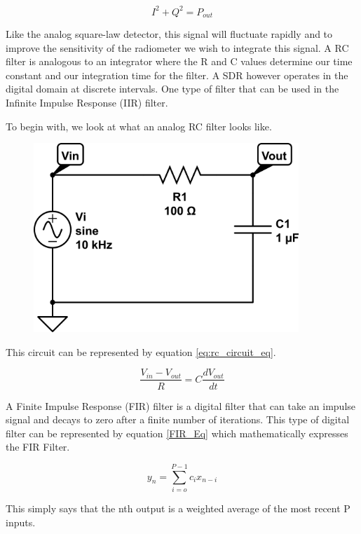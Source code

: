 \begin{equation}\label{sdr_x2}
I^2+Q^2 = P_{out}
\end{equation}

Like the analog square-law detector, this signal will fluctuate rapidly and to improve the sensitivity of the radiometer we wish to integrate this signal.  A RC filter is analogous to an integrator where the R and C values determine our time constant and our integration time for the filter.  A SDR however operates in the digital domain at discrete intervals.  One type of filter that can be used in the Infinite Impulse Response (IIR) filter. 

To begin with, we look at what an analog RC filter looks like. 

{\begin{figure}[h!tb] 
\centering
\includegraphics[width=10cm]{Images/rc-circuit.png}
\label{rc_circuit}
\end{figure}
}

This circuit can be represented by equation \ref{eq:rc_circuit_eq}.

\begin{equation}\label{eq:rc_circuit_eq}
\frac{V_{in}-V_{out}}{R}=C\frac{dV_{out}}{dt}
\end{equation}

A Finite Impulse Response (FIR) filter is a digital filter that can take an impulse signal and decays to zero after a finite number of iterations.  This type of digital filter can be represented by equation \ref{FIR_Eq} which mathematically expresses the FIR Filter.

\begin{equation}\label{FIR_Eq}
y_n=\displaystyle\sum\limits_{i=o}^{P-1} c_ix_{n-i}
\end{equation}

This simply says that the nth output is a weighted average of the most recent P inputs.  

